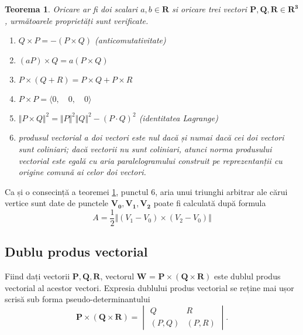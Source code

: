 \newtheorem{crossproduct_properties}[vector_arith]{Teorema}
\begin{crossproduct_properties}
\label{cross_properties}
Oricare ar fi doi scalari $\mathit{a, b} \in \mathbf{R}$ si oricare trei vectori
$\mathbf{P, Q, R} \in \mathbf{R^3}$, următoarele proprietăți sunt verificate.
\begin{enumerate}
  \item $Q \times P = -(P \times Q)$ (anticomutativitate)
  \item $(\mathit{a}P) \times Q = \mathit{a}(P \times Q)$
  \item $P \times (Q + R) = P \times Q + P \times R$
  \item $P \times P = \langle 0, \quad 0, \quad 0 \rangle$
  \item $\Vert P \times Q \Vert ^ 2 = \Vert P \Vert ^ 2 \Vert Q \Vert ^ 2 - (P
  \cdot Q) ^ 2$ (identitatea Lagrange)
  \item produsul vectorial a doi vectori este nul dacă și numai dacă cei doi
  vectori sunt coliniari; dacă vectorii nu sunt coliniari, atunci norma
  produsului vectorial este egală cu aria paralelogramului construit pe
  reprezentanții cu origine comună ai celor doi vectori.
\end{enumerate}
\end{crossproduct_properties}

Ca și o consecință a teoremei \ref{cross_properties}, punctul 6, 
aria unui triunghi arbitrar ale cărui vertice sunt date de punctele
$\mathbf{V_0, V_1, V_2}$ poate fi calculată după formula
\begin{equation}
\label{eq:vec:cross_tri_area}
A = \frac{1}{2} \Vert (V_1 - V_0) \times (V_2 - V_0) \Vert
\end{equation}

\subsection{Dublu produs vectorial}
\label{ch1:sec_vectors:sub_double_cross_product}
\indent

Fiind dați vectorii $\mathbf{P, Q, R}$, vectorul \textbf{W} = $\mathbf{P
\times (Q \times R)}$ este dublul produs vectorial al acestor vectori.
Expresia dublului produs vectorial se reține mai ușor scrisă sub forma
pseudo-determinantului
\begin{equation}
\label{eq:vec:double_vector_product}
\mathbf{P \times (Q \times R)} = 
\begin{vmatrix}
Q & R \\
(P, Q) & (P, R)
\end{vmatrix}.
\end{equation}

